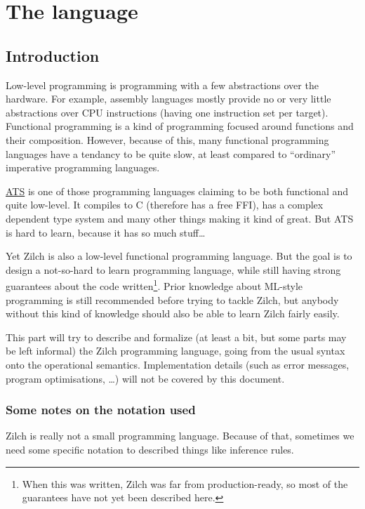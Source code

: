 \part{The language}\label{part:zilch}

\chapter{Introduction}\label{chap:zilch-introduction}

Low-level programming is programming with a few abstractions over the hardware.
For example, assembly languages mostly provide no or very little abstractions over CPU instructions (having one instruction set per target).
Functional programming is a kind of programming focused around functions and their composition.
However, because of this, many functional programming languages have a tendancy to be quite slow, at least compared to ``ordinary'' imperative programming languages.

\href{http://www.ats-lang.org/}{ATS} is one of those programming languages claiming to be both functional and quite low-level.
It compiles to C (therefore has a free FFI), has a complex dependent type system and many other things making it kind of great.
But ATS is hard to learn, because it has so much stuff\ldots

Yet Zilch is also a low-level functional programming language.
But the goal is to design a not-so-hard to learn programming language, while still having strong guarantees about the code written\footnote{When this was written, Zilch was far from production-ready, so most
of the guarantees have not yet been described here.}.
Prior knowledge about ML-style programming is still recommended before trying to tackle Zilch, but anybody without this kind of knowledge should also be able to learn Zilch fairly easily.

This part will try to describe and formalize (at least a bit, but some parts may be left informal) the Zilch programming language, going from the usual syntax onto the operational semantics.
Implementation details (such as error messages, program optimisations, \ldots) will not be covered by this document.

\section*{Some notes on the notation used}\label{sec:zilch-introduction-notation}

Zilch is really not a small programming language.
Because of that, sometimes we need some specific notation to described things like inference rules.

